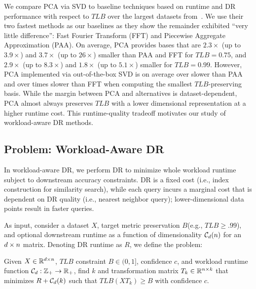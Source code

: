 We compare PCA via SVD to baseline techniques based on runtime and DR performance with respect to $TLB$ over the largest datasets from~\cite{keogh-study}. 
We use their two fastest methods as our baselines as they show the remainder exhibited ``very little difference'': Fast Fourier Transform (FFT) and Piecewise Aggregate Approximation (PAA).
On average, PCA provides bases that are $2.3\times$ (up to $3.9\times$) and $3.7\times$ (up to $26\times$)  smaller than PAA and FFT for $TLB = 0.75$, and $2.9\times$ (up to $8.3\times$) and $1.8\times$ (up to $5.1\times$) smaller for $TLB = 0.99$.
However, PCA implemented via out-of-the-box SVD is on average over  slower than PAA and over  times slower than FFT when computing the smallest $TLB$-preserving basis.
While the margin between PCA and alternatives is dataset-dependent, PCA almost always preserves $TLB$ with a lower dimensional representation at a higher runtime cost.
This runtime-quality tradeoff motivates our study of workload-aware DR methods. 




\subsection{Problem: Workload-Aware DR}
\label{subsec:wadr}

In workload-aware DR, we perform DR to minimize whole workload runtime subject to downstream accuracy constraints.
DR is a fixed cost (i.e., index construction for similarity search), while each query incurs a marginal cost that is dependent on DR quality (i.e., nearest neighbor query); lower-dimensional data points result in faster queries. 

As input, consider a dataset $X$, target metric preservation $B$(e.g., $TLB \geq .99$), and optional downstream runtime as a function of dimensionality $\mathcal{C}_{\color{black}d}({\color{black}n})$ for an ${\color{black}d}\times {\color{black}n}$ matrix.  
Denoting DR runtime as $R$, we define the problem:
\begin{problem}
\label{def:opt}
  Given $X \in \mathbb{R}^{{\color{black}d} \times {\color{black}n}}$, $TLB$ constraint $B \in 
  (0, 1]$, confidence $c$, and workload runtime function $\mathcal{C}_{\color{black}d}:\mathbb{Z}_{+} \rightarrow \mathbb{R}_{+}$, find $k$ and transformation
  matrix $T_k \in \mathbb{R}^{{\color{black}n} \times k}$ that minimizes $R + \mathcal{C}_{\color{black}d}(k)$
  such that $TLB(XT_k) \geq B$ with confidence $c$.
\end{problem}

